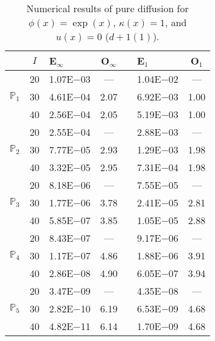 \begin{table}[H]
\centering
\caption{Numerical results of pure diffusion for $\phi(x)=\exp(x)$, $\kappa(x)=1$, and $u(x)=0$ ($d+1 (1)$).}
\begin{tabular}{@{}l c l c c l c@{}}
\toprule
 & $I$ & E$_{\infty}$ & O$_{\infty}$ && E$_1$ & O$_1$\\
\midrule
\multirow{3}{*}{$\mathbb{P}_{1}$}
 & 20 & 1.07E$-$03 & --- && 1.04E$-$02 & ---\\
 & 30 & 4.61E$-$04 & 2.07 && 6.92E$-$03 & 1.00\\
 & 40 & 2.56E$-$04 & 2.05 && 5.19E$-$03 & 1.00\\
\midrule
\multirow{3}{*}{$\mathbb{P}_{2}$}
 & 20 & 2.55E$-$04 & --- && 2.88E$-$03 & ---\\
 & 30 & 7.77E$-$05 & 2.93 && 1.29E$-$03 & 1.98\\
 & 40 & 3.32E$-$05 & 2.95 && 7.31E$-$04 & 1.98\\
\midrule
\multirow{3}{*}{$\mathbb{P}_{3}$}
 & 20 & 8.18E$-$06 & --- && 7.55E$-$05 & ---\\
 & 30 & 1.77E$-$06 & 3.78 && 2.41E$-$05 & 2.81\\
 & 40 & 5.85E$-$07 & 3.85 && 1.05E$-$05 & 2.88\\
\midrule
\multirow{3}{*}{$\mathbb{P}_{4}$}
 & 20 & 8.43E$-$07 & --- && 9.17E$-$06 & ---\\
 & 30 & 1.17E$-$07 & 4.86 && 1.88E$-$06 & 3.91\\
 & 40 & 2.86E$-$08 & 4.90 && 6.05E$-$07 & 3.94\\
\midrule
\multirow{3}{*}{$\mathbb{P}_{5}$}
 & 20 & 3.47E$-$09 & --- && 4.35E$-$08 & ---\\
 & 30 & 2.82E$-$10 & 6.19 && 6.53E$-$09 & 4.68\\
 & 40 & 4.82E$-$11 & 6.14 && 1.70E$-$09 & 4.68\\
\bottomrule
\end{tabular}
\end{table}